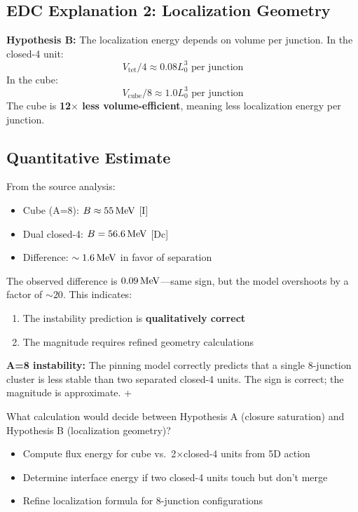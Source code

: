 \subsection{EDC Explanation 2: Localization Geometry}

\begin{derivationbox}
    \textbf{Hypothesis B:} The localization energy depends on volume
    per junction. In the closed-4 unit:
    \begin{equation}
        V_{\text{tet}}/4 \approx 0.08 L_0^3 \text{ per junction}
    \end{equation}
    In the cube:
    \begin{equation}
        V_{\text{cube}}/8 \approx 1.0 L_0^3 \text{ per junction}
    \end{equation}
    The cube is \textbf{12$\times$ less volume-efficient}, meaning
    less localization energy per junction.
    \tagP
\end{derivationbox}

\subsection{Quantitative Estimate}

From the source analysis:
\begin{itemize}
    \item Cube (A=8): $B \approx 55\,\mathrm{MeV}$ [I]
    \item Dual closed-4: $B = 56.6\,\mathrm{MeV}$ [Dc]
    \item Difference: $\sim 1.6\,\mathrm{MeV}$ in favor of separation
\end{itemize}

The observed difference is $0.09\,\mathrm{MeV}$---same sign, but the model
overshoots by a factor of $\sim 20$. This indicates:
\begin{enumerate}
    \item The instability prediction is \textbf{qualitatively correct}
    \item The magnitude requires refined geometry calculations
\end{enumerate}

\begin{resultbox}
    \textbf{A=8 instability:} The pinning model correctly predicts that
    a single 8-junction cluster is less stable than two separated
    closed-4 units. The sign is correct; the magnitude is approximate.
    \tagP + \tagI
\end{resultbox}

\begin{edcopenbox}[title=Open: A=8 Precision]
    What calculation would decide between Hypothesis A (closure saturation)
    and Hypothesis B (localization geometry)?
    \begin{itemize}
        \item Compute flux energy for cube vs.\ 2$\times$closed-4 units from 5D action
        \item Determine interface energy if two closed-4 units touch but don't merge
        \item Refine localization formula for 8-junction configurations
    \end{itemize}
    \tagOpen
\end{edcopenbox}

